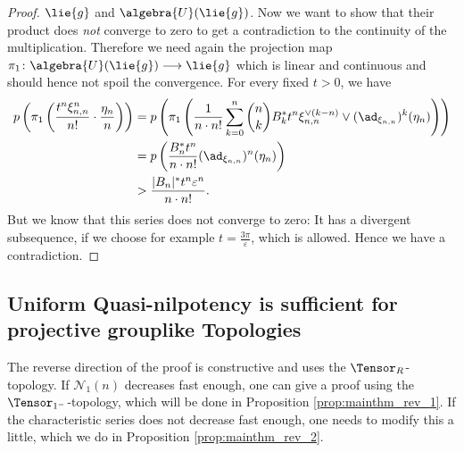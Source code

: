 \documentclass[
11pt,                          %
english                        %
]{article}
\begin{document}
\begin{proof}
	$\lie{g}$ and $\algebra{U}(\lie{g})$.
	Now we want to show that their product does \emph{not} converge to zero
	to get a contradiction to the continuity of the multiplication. Therefore
	we need again the projection map $\pi_1 \colon \algebra{U}(\lie{g}) 
	\longrightarrow \lie{g}$ which is linear and continuous and should hence not 
	spoil the convergence. For every fixed $t > 0$, we have
	\begin{align*}
		p \left(
			\pi_1\left(
				\frac{t^n \xi_{n,n}^n}{n!}
				\cdot
				\frac{\eta_n}{n}
			\right)
		\right)
		&=
		p\left(
			\pi_1 \left(
				\frac{1}{n \cdot n!}
				\sum\limits_{k=0}^n
				\binom{n}{k}
				B_k^* t^n
				\xi_{n,n}^{\vee(k-n)}
				\vee
				(\ad_{\xi_{n,n}})^k(\eta_n)
			\right)
		\right)
		\\
		& =
		p\left(
			\frac{B_n^* t^n}{n \cdot n!}
			(\ad_{\xi_{n,n}})^n(\eta_n)
		\right)
		\\
		& >
		\frac{|B_n|^* t^n \varepsilon^n}{n \cdot n!}.
	\end{align*}
	But we know that this series does not converge to zero: It has a divergent 
	subsequence, if we choose for example $t = \frac{3 \pi}{\varepsilon}$, which is 
	allowed. Hence we have a contradiction.
\end{proof}


\subsection{Uniform Quasi-nilpotency is sufficient for projective grouplike 
Topologies}

The reverse direction of the proof is constructive and uses the 
$\Tensor_R$-topology. If $\mathcal{N}_1(n)$ decreases fast enough, one can
give a proof using the $\Tensor_{1^-}$-topology, which will be done in Proposition
\ref{prop:mainthm_rev_1}. If the characteristic series does not decrease fast 
enough, one needs to modify this a little, which we do in Proposition
\ref{prop:mainthm_rev_2}.
\end{document}
